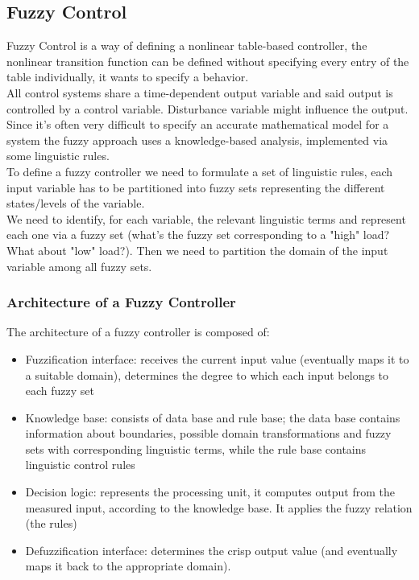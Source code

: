 \subsection{Fuzzy Control}

Fuzzy Control is a way of defining a nonlinear table-based controller, the nonlinear transition function can be defined without specifying every entry of the table individually, it wants to specify a behavior.\\
All control systems share a time-dependent output variable and said output is controlled by a control variable. Disturbance variable might influence the output.\\

Since it's often very difficult to specify an accurate mathematical model for a system the fuzzy approach uses a knowledge-based analysis, implemented via some linguistic rules.\\
To define a fuzzy controller we need to formulate a set of linguistic rules, each input variable has to be partitioned into fuzzy sets representing the different states/levels of the variable. \\
We need to identify, for each variable, the relevant linguistic terms and represent each one via a fuzzy set (what's the fuzzy set corresponding to a "high" load? What about "low" load?). Then we need to partition the domain of the input variable among all fuzzy sets.\\

\subsubsection{Architecture of a Fuzzy Controller}
The architecture of a fuzzy controller is composed of: 
\begin{itemize}
	\item Fuzzification interface: receives the current input value (eventually maps it to a suitable domain), determines the degree to which each input belongs to each fuzzy set
	\item Knowledge base: consists of data base and rule base; the data base contains information about boundaries, possible domain transformations and fuzzy sets with corresponding linguistic terms, while the rule base contains linguistic control rules
	\item Decision logic: represents the processing unit, it computes output from the measured input, according to the knowledge base. It applies the fuzzy relation (the rules)
	\item Defuzzification interface: determines the crisp output value (and eventually maps it back to the appropriate domain).
\end{itemize}

